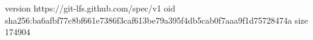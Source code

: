 version https://git-lfs.github.com/spec/v1
oid sha256:ba6afbf77c8bf661e7386f3caf613be79a395f4db5cab0f7aaa9f1d75728474a
size 174904
